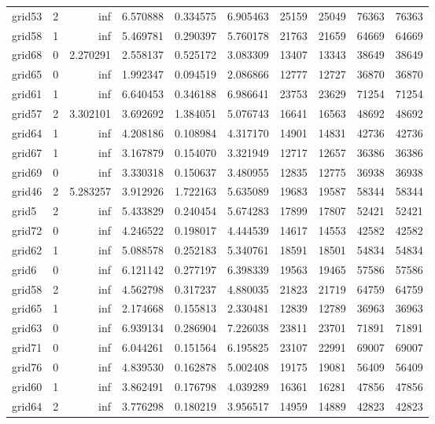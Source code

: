 \begin{longtable}{|l|r|r|r|r|r|r|r|r|r|}
grid53 & 2 & inf & 6.570888 & 0.334575 & 6.905463 & 25159 & 25049 & 76363 & 76363 \\
grid58 & 1 & inf & 5.469781 & 0.290397 & 5.760178 & 21763 & 21659 & 64669 & 64669 \\
grid68 & 0 & 2.270291 & 2.558137 & 0.525172 & 3.083309 & 13407 & 13343 & 38649 & 38649 \\
grid65 & 0 & inf & 1.992347 & 0.094519 & 2.086866 & 12777 & 12727 & 36870 & 36870 \\
grid61 & 1 & inf & 6.640453 & 0.346188 & 6.986641 & 23753 & 23629 & 71254 & 71254 \\
grid57 & 2 & 3.302101 & 3.692692 & 1.384051 & 5.076743 & 16641 & 16563 & 48692 & 48692 \\
grid64 & 1 & inf & 4.208186 & 0.108984 & 4.317170 & 14901 & 14831 & 42736 & 42736 \\
grid67 & 1 & inf & 3.167879 & 0.154070 & 3.321949 & 12717 & 12657 & 36386 & 36386 \\
grid69 & 0 & inf & 3.330318 & 0.150637 & 3.480955 & 12835 & 12775 & 36938 & 36938 \\
grid46 & 2 & 5.283257 & 3.912926 & 1.722163 & 5.635089 & 19683 & 19587 & 58344 & 58344 \\
grid5 & 2 & inf & 5.433829 & 0.240454 & 5.674283 & 17899 & 17807 & 52421 & 52421 \\
grid72 & 0 & inf & 4.246522 & 0.198017 & 4.444539 & 14617 & 14553 & 42582 & 42582 \\
grid62 & 1 & inf & 5.088578 & 0.252183 & 5.340761 & 18591 & 18501 & 54834 & 54834 \\
grid6 & 0 & inf & 6.121142 & 0.277197 & 6.398339 & 19563 & 19465 & 57586 & 57586 \\
grid58 & 2 & inf & 4.562798 & 0.317237 & 4.880035 & 21823 & 21719 & 64759 & 64759 \\
grid65 & 1 & inf & 2.174668 & 0.155813 & 2.330481 & 12839 & 12789 & 36963 & 36963 \\
grid63 & 0 & inf & 6.939134 & 0.286904 & 7.226038 & 23811 & 23701 & 71891 & 71891 \\
grid71 & 0 & inf & 6.044261 & 0.151564 & 6.195825 & 23107 & 22991 & 69007 & 69007 \\
grid76 & 0 & inf & 4.839530 & 0.162878 & 5.002408 & 19175 & 19081 & 56409 & 56409 \\
grid60 & 1 & inf & 3.862491 & 0.176798 & 4.039289 & 16361 & 16281 & 47856 & 47856 \\
grid64 & 2 & inf & 3.776298 & 0.180219 & 3.956517 & 14959 & 14889 & 42823 & 42823 \\

\end{longtable}
